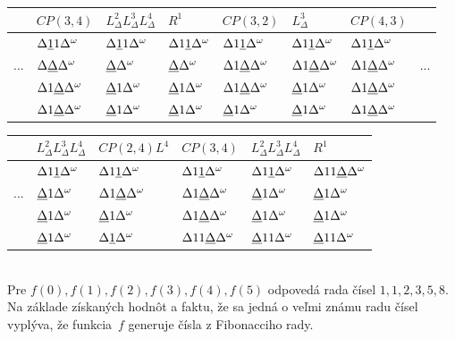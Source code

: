 \documentclass[11pt,a4paper]{article}
\newcommand{\D}{\Delta}
\newcommand{\EOT}{\Delta^\omega} %
\newcommand{\UL}[1]{\underbar{$#1$}} %
\begin{document}
\begin{center}
  \begin{tabular}{r|l|l|l|l|l|l|l}
        &\tiny{$CP(3,4)$}    & \tiny{$L^2_\D L^3_\D L^4_\D$} & \tiny{$R^1$}       & \tiny{$CP(3,2)$}    & \tiny{$L^3_\D$}     & \tiny{$CP(4,3)$}    & \\\hline
        &$\D \UL{1} 1 \EOT$  & $\D \UL{1} 1 \EOT$            & $\D 1 \UL{1} \EOT$ & $\D 1 \UL{1} \EOT$  & $\D 1 \UL{1} \EOT$  & $\D 1 \UL{1} \EOT$  & \\
    ... &$\D \UL{\D} \EOT$   & $\UL{\D} \EOT$                & $\UL{\D} \EOT$     & $\D 1 \UL{\D} \EOT$ & $\D 1 \UL{\D} \EOT$ & $\D 1 \UL{\D} \EOT$ & ... \\
        &$\D 1 \UL{\D} \EOT$ & $\UL{\D} 1 \EOT$              & $\UL{\D} 1 \EOT$   & $\D 1 \UL{\D} \EOT$ & $\UL{\D} 1 \EOT$    & $\D 1 \UL{\D} \EOT$ & \\
        &$\D 1 \UL{\D} \EOT$ & $\UL{\D} 1 \EOT$              & $\UL{\D} 1 \EOT$   & $\UL{\D} 1 \EOT$    & $\UL{\D} 1 \EOT$    & $\D 1 \UL{\D} \EOT$ & \\
  \end{tabular}
\end{center}

\begin{flushright}
  \begin{tabular}{r|l|l|l|l|l}
        & \tiny{$L^2_\D L^3_\D L^4_\D$} & \tiny{$CP(2,4)L^4$} & \tiny{$CP(3,4)$}      & \tiny{$L^2_\D L^3_\D L^4_\D$} & \tiny{$R^1$}          \\\hline
        & $\D 1 \UL{1} \EOT$            & $\D 1 \UL{1} \EOT$  & $\D 1 \UL{1} \EOT$    & $\D 1 \UL{1} \EOT$            & $\D 1 1 \UL{\D} \EOT$ \\
    ... & $\UL{\D} 1 \EOT$              & $\D 1 \UL{\D} \EOT$ & $\D 1 \UL{\D} \EOT$   & $\UL{\D} 1 \EOT$              & $\UL{\D} 1 \EOT$      \\
        & $\UL{\D} 1 \EOT$              & $\UL{\D} 1 \EOT$    & $\D 1 \UL{\D} \EOT$   & $\UL{\D} 1 \EOT$              & $\UL{\D} 1 \EOT$      \\
        & $\UL{\D} 1 \EOT$              & $\D \UL{1} \EOT$    & $\D 1 1 \UL{\D} \EOT$ & $\UL{\D} 1 1 \EOT$            & $\UL{\D} 1 1 \EOT$    \\
  \end{tabular}
\end{flushright}

\hfill\\[-1em]

Pre $f(0),f(1),f(2),f(3),f(4),f(5)$ odpovedá rada čísel $1,1,2,3,5,8$. Na základe získaných hodnôt a faktu, že sa jedná o veľmi známu radu čísel vyplýva, že funkcia~$f$ generuje čísla z Fibonacciho rady.
\end{document}
